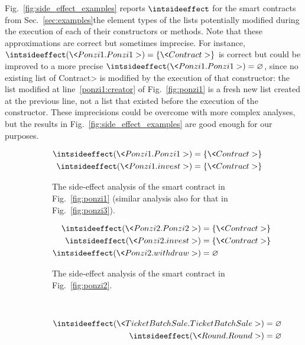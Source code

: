 \begin{example}\label{ex:side_effect}
  Fig.~\ref{fig:side_effect_examples} reports $\intsideeffect$ for the smart contracts from
  Sec.~\ref{sec:examples}\ie the element types of the lists potentially modified during
  the execution of each of their constructors or methods. Note that these approximations are correct
  but sometimes imprecise. For instance, $\intsideeffect(\<Ponzi1.Ponzi1>)=\{\<Contract>\}$
  is correct but could be improved to a more precise $\intsideeffect(\<Ponzi1.Ponzi1>)=\varnothing$,
  since no existing list of \<Contract> is modified by the execution of that constructor:
  the list modified at line~\ref{ponzi1:creator} of Fig.~\ref{fig:ponzi1}
  is a fresh new list created at the previous line, not a list that existed before the
  execution of the constructor. These imprecisions could be overcome with more complex analyses,
  but the results in Fig.~\ref{fig:side_effect_examples} are good enough for our purposes.
  \begin{figure}[t]
    \begin{center}
    \begin{subfigure}{0.42\textwidth}
      \begin{align*}
        \intsideeffect(\<Ponzi1.Ponzi1>)&=\{\<Contract>\}\\
        \intsideeffect(\<Ponzi1.invest>)&=\{\<Contract>\}
      \end{align*}
      \caption{The side-effect analysis of the smart contract in Fig.~\ref{fig:ponzi1}
      (similar analysis also for that in Fig.~\ref{fig:ponzi3}).}
    \end{subfigure}
    \qquad
    \begin{subfigure}{0.42\textwidth}
      \begin{align*}
        \intsideeffect(\<Ponzi2.Ponzi2>)&=\{\<Contract>\}\\
        \intsideeffect(\<Ponzi2.invest>)&=\{\<Contract>\}\\
        \intsideeffect(\<Ponzi2.withdraw>)&=\varnothing
      \end{align*}
      \caption{The side-effect analysis of the smart contract in Fig.~\ref{fig:ponzi2}.}
    \end{subfigure}\\
    \begin{subfigure}{\textwidth}
      \begin{align*}
        \intsideeffect(\<TicketBatchSale.TicketBatchSale>)&=\varnothing\\
        \intsideeffect(\<Round.Round>)&=\varnothing\\

\end{align*}
\end{subfigure}
\end{center}
\end{figure}
\end{example}
